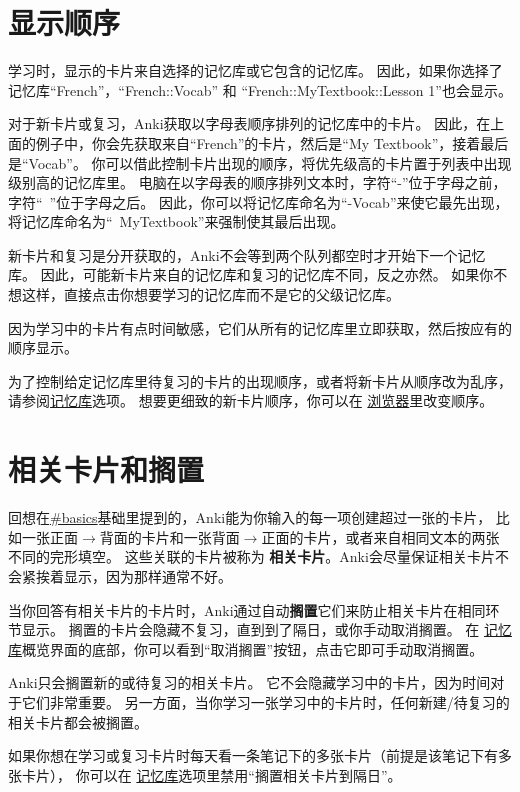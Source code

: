 \documentclass[a4paper]{book}
\begin{document}
	\section{显示顺序}\label{displayorder}
	
	学习时，显示的卡片来自选择的记忆库或它包含的记忆库。 因此，如果你选择了记忆库“French”，“French::Vocab” 和 “French::MyTextbook::Lesson 1”也会显示。
	
	对于新卡片或复习，Anki获取以字母表顺序排列的记忆库中的卡片。 因此，在上面的例子中，你会先获取来自“French”的卡片，然后是“My Textbook”，接着最后是“Vocab”。 你可以借此控制卡片出现的顺序，将优先级高的卡片置于列表中出现级别高的记忆库里。 电脑在以字母表的顺序排列文本时，字符“-”位于字母之前，字符“~”位于字母之后。 因此，你可以将记忆库命名为“-Vocab”来使它最先出现，将记忆库命名为“~MyTextbook”来强制使其最后出现。
	
	新卡片和复习是分开获取的，Anki不会等到两个队列都空时才开始下一个记忆库。 因此，可能新卡片来自的记忆库和复习的记忆库不同，反之亦然。 如果你不想这样，直接点击你想要学习的记忆库而不是它的父级记忆库。
	
	因为学习中的卡片有点时间敏感，它们从所有的记忆库里立即获取，然后按应有的顺序显示。
	
	为了控制给定记忆库里待复习的卡片的出现顺序，或者将新卡片从顺序改为乱序，请参阅\hyperref[deckoptions]{记忆库}选项。 想要更细致的新卡片顺序，你可以在
	\hyperref[browser]{浏览器}里改变顺序。
	\section{相关卡片和搁置}
	
	回想在\url{#basics}基础里提到的，Anki能为你输入的每一项创建超过一张的卡片， 比如一张正面$\to$背面的卡片和一张背面$\to$正面的卡片，或者来自相同文本的两张不同的完形填空。 这些关联的卡片被称为
	\textbf{相关卡片}。Anki会尽量保证相关卡片不会紧挨着显示，因为那样通常不好。
	
	当你回答有相关卡片的卡片时，Anki通过自动\textbf{搁置}它们来防止相关卡片在相同环节显示。 搁置的卡片会隐藏不复习，直到到了隔日，或你手动取消搁置。 在
	\hyperref[deckoverview]{记忆库}概览界面的底部，你可以看到“取消搁置”按钮，点击它即可手动取消搁置。
	
	Anki只会搁置新的或待复习的相关卡片。 它不会隐藏学习中的卡片，因为时间对于它们非常重要。 另一方面，当你学习一张学习中的卡片时，任何新建/待复习的相关卡片都会被搁置。
	
	如果你想在学习或复习卡片时每天看一条笔记下的多张卡片（前提是该笔记下有多张卡片）， 你可以在
	\hyperref[deckoptions]{记忆库}选项里禁用“搁置相关卡片到隔日”。
	
\end{document}
